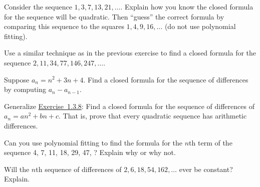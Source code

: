 \documentclass[11pt,]{book}
\theoremstyle{ptxplainnotitle}
\theoremstyle{ptxplaintitle}
\theoremstyle{ptxdefinitionnotitle}
\theoremstyle{ptxdefinitiontitle}
\theoremstyle{ptxdefinitionnotitle}
\theoremstyle{ptxdefinitiontitle}
\theoremstyle{ptxdefinitionnotitle}
\theoremstyle{ptxdefinitiontitle}
\theoremstyle{ptxdefinitiontitlenonumber}
\theoremstyle{ptxdefinitiontitlenonumber}
\numberwithin{equation}{chapter}
\begin{document}
\begin{divisionexercise}{6}\hypertarget{exercise-34}{}
\hypertarget{p-390}{}%
Consider the sequence \(1, 3, 7, 13, 21, \ldots\). Explain how you know the closed formula for the sequence will be quadratic. Then ``guess'' the correct formula by comparing this sequence to the squares \(1, 4, 9, 16, \ldots\) (do not use polynomial fitting).%
\end{divisionexercise}%
\begin{divisionexercise}{7}\hypertarget{exercise-35}{}
\hypertarget{p-393}{}%
Use a similar technique as in the previous exercise to find a closed formula for the sequence \(2, 11, 34, 77, 146, 247,\ldots\).%
\end{divisionexercise}%
\begin{divisionexercise}{8}\hypertarget{ex_quad-diff}{}
\hypertarget{p-397}{}%
Suppose \(a_n = n^2 + 3n + 4\text{.}\) Find a closed formula for the sequence of differences by computing \(a_n - a_{n-1}\text{.}\)%
\end{divisionexercise}%
\begin{divisionexercise}{9}\hypertarget{exercise-37}{}
\hypertarget{p-399}{}%
Generalize \hyperlink{ex_quad-diff}{Exercise~1.3.8}: Find a closed formula for the sequence of differences of \(a_n = an^2 + bn + c\). That is, prove that every quadratic sequence has arithmetic differences.%
\end{divisionexercise}%
\begin{divisionexercise}{10}\hypertarget{exercise-38}{}
\hypertarget{p-401}{}%
Can you use polynomial fitting to find the formula for the \(n\)th term of the sequence 4, 7, 11, 18, 29, 47, \textellipsis{}? Explain why or why not.%
\end{divisionexercise}%
\begin{divisionexercise}{11}\hypertarget{exercise-39}{}
\hypertarget{p-403}{}%
Will the \(n\)th sequence of differences of \(2, 6, 18, 54, 162, \ldots\) ever be constant? Explain.%
\end{divisionexercise}%
\end{document}
